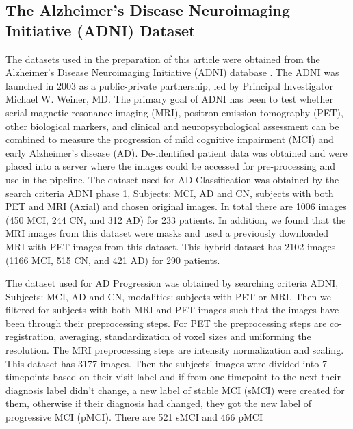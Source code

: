 \subsection{The Alzheimer’s Disease Neuroimaging Initiative (ADNI) Dataset}
The datasets used in the preparation of this article were obtained from the Alzheimer’s Disease Neuroimaging Initiative (ADNI) database \cite{lu_multimodal_2018}. The ADNI was launched in 2003 as a public-private partnership, led by Principal Investigator Michael W. Weiner, MD. The primary goal of ADNI has been to test whether serial magnetic resonance imaging (MRI), positron emission tomography (PET), other biological markers, and clinical and neuropsychological assessment can be combined to measure the progression of mild cognitive impairment (MCI) and early Alzheimer’s disease (AD). De-identified patient data was obtained and were placed into a server where the images could be accessed for pre-processing and use in the pipeline. The dataset used for AD Classification was obtained by the search criteria ADNI phase 1, Subjects: MCI, AD and CN, subjects with both PET and MRI (Axial) and chosen original images. In total there are 1006 images (450 MCI, 244 CN, and 312 AD) for 233 patients. In addition, we found that the MRI images from this dataset were masks and used a previously downloaded MRI with PET images from this dataset.   This hybrid dataset has 2102 images (1166 MCI, 515 CN, and 421 AD) for 290 patients.  

The dataset used for AD Progression was obtained by searching criteria ADNI, Subjects: MCI, AD and CN, modalities: subjects with PET or MRI. Then we filtered for subjects with both MRI and PET images such that the images have been through their preprocessing steps. For PET the preprocessing steps are co-registration, averaging, standardization of voxel sizes and uniforming the resolution.  The MRI preprocessing steps are intensity normalization and scaling. This dataset has 3177 images. Then the subjects’ images were divided into 7 timepoints based on their visit label and if from one timepoint to the next their diagnosis label didn’t change, a new label of stable MCI (sMCI) were created for them, otherwise if their diagnosis had changed, they got the new label of progressive MCI (pMCI). There are 521 sMCI and 466 pMCI
